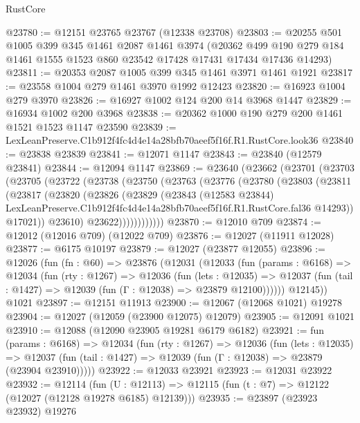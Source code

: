 \begin{lexlean}{RustCore}
\begin{coremodule}
@23780 := @12151 @23765 @23767 (@12338 @23708)
@23803 := @20255
    @501
    @1005
    @399
    @345
    @1461
    @2087
    @1461
    @3974
    (@20362 @499 @190 @279 @184 @1461 @1555 @1523 @860 @23542 @17428 @17431 @17434 @17436 @14293)
@23811 := @20353 @2087 @1005 @399 @345 @1461 @3971 @1461 @1921
@23817 := @23558 @1004 @279 @1461 @3970 @1992 @12423
@23820 := @16923 @1004 @279 @3970
@23826 := @16927 @1002 @124 @200 @14 @3968 @1447
@23829 := @16934 @1002 @200 @3968
@23838 := @20362 @1000 @190 @279 @200 @1461 @1521 @1523 @1147 @23590
@23839 := LexLeanPreserve.C1b912f4fc4d4e14a28bfb70aeef5f16f.R1.RustCore.look36
@23840 := @23838 @23839
@23841 := @12071 @1147
@23843 := @23840 (@12579 @23841)
@23844 := @12094 @1147
@23869 := @23640
    (@23662
      (@23701
        (@23703
          (@23705
            (@23722
              (@23738
                (@23750
                  (@23763
                    (@23776
                      (@23780
                        (@23803
                          (@23811
                            (@23817
                              (@23820
                                (@23826
                                  (@23829
                                    (@23843
                                      (@12583 @23844)
                                      LexLeanPreserve.C1b912f4fc4d4e14a28bfb70aeef5f16f.R1.RustCore.fal36
                                      @14293))
                                  @17021))
                              @23610)
                            @23622))))))))))))
@23870 := @12010 @709
@23874 := @12012 (@12016 @709) (@12022 @709)
@23876 := @12027 (@11911 @12028)
@23877 := @6175 @10197
@23879 := @12027 (@23877 @12055)
@23896 := @12026
    (fun (fn : @60) =>
    @23876
      (@12031
        (@12033
          (fun (params : @6168) =>
          @12034
            (fun (rty : @1267) =>
            @12036
              (fun (lets : @12035) =>
              @12037 (fun (tail : @1427) => @12039 (fun (Γ : @12038) => @23879 @12100))))))
        @12145))
    @1021
@23897 := @12151 @11913
@23900 := @12067 (@12068 @1021) @19278
@23904 := @12027 (@12059 (@23900 @12075) @12079)
@23905 := @12091 @1021
@23910 := @12088 (@12090 @23905 @19281 @6179 @6182)
@23921 := fun (params : @6168) =>
  @12034
    (fun (rty : @1267) =>
    @12036
      (fun (lets : @12035) =>
      @12037 (fun (tail : @1427) => @12039 (fun (Γ : @12038) => @23879 (@23904 @23910)))))
@23922 := @12033 @23921
@23923 := @12031 @23922
@23932 := @12114
    (fun (U : @12113) => @12115 (fun (t : @7) => @12122 (@12027 (@12128 @19278 @6185) @12139)))
@23935 := @23897 (@23923 @23932) @19276

\end{coremodule}
\end{lexlean}
